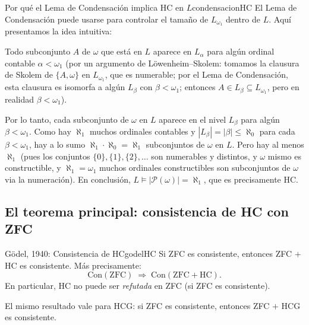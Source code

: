 \begin{observacion}{Por qué el Lema de Condensación implica HC en $L$}{condensacionHC}
El Lema de Condensación puede usarse para controlar el tamaño de $L_{\omega_1}$ dentro de $L$. Aquí presentamos la idea intuitiva:

Todo subconjunto $A$ de $\omega$ que está en $L$ aparece en $L_\alpha$ para algún ordinal contable $\alpha < \omega_1$ (por un argumento de Löwenheim--Skolem: tomamos la clausura de Skolem de $\{A, \omega\}$ en $L_{\omega_1}$, que es numerable; por el Lema de Condensación, esta clausura es isomorfa a algún $L_\beta$ con $\beta < \omega_1$; entonces $A \in L_\beta \subseteq L_{\omega_1}$, pero en realidad $\beta < \omega_1$).

Por lo tanto, cada subconjunto de $\omega$ en $L$ aparece en el nivel $L_\beta$ para algún $\beta < \omega_1$. Como hay $\aleph_1$ muchos ordinales contables y $|L_\beta| = |\beta| \leq \aleph_0$ para cada $\beta < \omega_1$, hay a lo sumo $\aleph_1 \cdot \aleph_0 = \aleph_1$ subconjuntos de $\omega$ en $L$. Pero hay al menos $\aleph_1$ (pues los conjuntos $\{0\}, \{1\}, \{2\}, \ldots$ son numerables y distintos, y $\omega$ mismo es constructible, y $\aleph_1 = \omega_1$ muchos ordinales constructibles son subconjuntos de $\omega$ via la numeración). En conclusión, $L \models |\mathcal{P}(\omega)| = \aleph_1$, que es precisamente HC.
\end{observacion}

\subsection{El teorema principal: consistencia de HC con ZFC}

\begin{teorema}{Gödel, 1940: Consistencia de HC}{godelHC}
Si ZFC es consistente, entonces ZFC $+$ HC es consistente. Más precisamente:
\[
  \mathrm{Con}(\mathrm{ZFC}) \;\Rightarrow\; \mathrm{Con}(\mathrm{ZFC} + \mathrm{HC}).
\]
En particular, HC no puede ser \emph{refutada} en ZFC (si ZFC es consistente).

El mismo resultado vale para HCG: si ZFC es consistente, entonces ZFC $+$ HCG es consistente.
\end{teorema}

